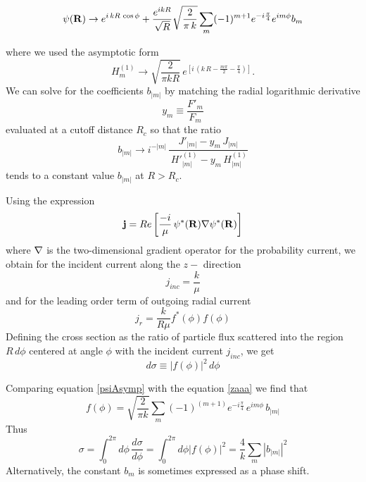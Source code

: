 \begin{equation}\label{zaaa}
  \psi({\bf R}) \rightarrow e^{i\,k R \, \cos\phi} + \frac{e^{ikR}}{\sqrt{R}}\sqrt{\frac{2}{\pi\,k}}\sum_{m}(-1)^{m+1}e^{-i\frac{\pi}{4}}e^{im\phi}b_{m}
\end{equation}

where we used the asymptotic form
\begin{equation}
H^{(1)}_{m} \rightarrow \sqrt{\frac{2}{\pi k R}} \, e^{\left[i \, (k \, R -\frac{m \pi}{2} -\frac{\pi}{4}) \right]}.
\end{equation}
We can solve for the coefficients $b_{|m|}$ by matching the radial logarithmic derivative
\begin{equation}
y_{m} \equiv \frac{F'_{m}}{F_{m}}
\end{equation}
evaluated at a cutoff distance $R_{c}$ so that the ratio
\begin{equation}\label{bm2DReg}
b_{|m|} \rightarrow i^{-|m|} \, \frac{J'_{|m|} - y_{m} \, J_{|m|} }{ \, H'^{(1)}_{|m|} - y_{m} \, H^{(1)}_{|m|} }
\end{equation}
tends to a constant value $b_{|m|} $ at $ R>R_{c}$.

Using the expression
\begin{equation}
  {\bf j} = Re \left[\frac{-i}{\mu} \, \psi^{*}({\bf R}){\nabla }\psi^{*}({\bf R}) \right]
\end{equation}
where ${\bf \nabla}$ is the two-dimensional gradient operator for the probability current, we obtain for the incident current
along the $z-$ direction
\begin{equation}
j_{inc} = \frac{ k}{\mu}
\end{equation}
and for the leading order term of outgoing radial current
\begin{equation}
j_{r} = \frac{k}{R \mu } f^{*}(\phi)f(\phi)
\end{equation}
Defining the cross section as the ratio of particle flux scattered into the region $ R \, d \phi $ centered at angle $\phi$ with the incident current $j_{inc}$, we get
\begin{equation}
d\sigma   \equiv   |f(\phi)|^2 \, d\phi
\end{equation}

Comparing equation \eqref{psiAsymp} with the equation \eqref{zaaa} we find that
\begin{equation}
f(\phi) = \sqrt{\frac{2}{\pi k}} \sum_{m} (-1)^{(m+1)} e^{- i \frac{\pi}{4}}\,e^{i m \phi} \,b_{|m|}
\end{equation}
Thus
\begin{equation}
\sigma= \int_{0}^{2\pi} d\phi \, \frac{d\sigma}{d \phi} = \int_{0}^{2\pi} d\phi |f(\phi)|^2 = \frac{4}{k} \sum_{m} |b_{|m|}|^2
\end{equation}
Alternatively, the constant $ b_{m} $ is sometimes expressed as a phase shift.



